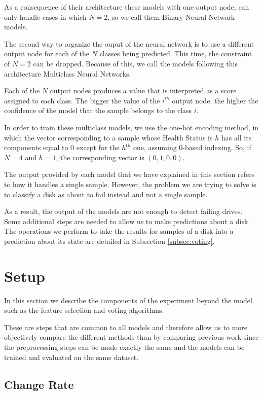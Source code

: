 As a consequence of their architecture these models with one output node, can only handle cases in which $N = 2$, so we call them Binary Neural Network models.

The second way to organize the ouput of the neural network is to use a different output node for each of the $N$ classes being predicted.
This time, the constraint of $N=2$ can be dropped.
Because of this, we call the models following this architecture Multiclass Neural Networks.

Each of the $N$ output nodes produces a value that is interpreted as a score assigned to each class.
The bigger the value of the $i^{th}$ output node, the higher the confidence of the model that the sample belongs to the class $i$.

In order to train these multiclass models, we use the one-hot encoding method, in which the vector corresponding to a sample whose Health Status is $h$ has all its components equal to 0 except for the $h^{th}$ one, assuming 0-based indexing.
So, if $N = 4$ and $h = 1$, the corresponding vector is $(0,1,0,0)$.

The output provided by each model that we have explained in this section refers to how it handles a single sample.
However, the problem we are trying to solve is to classify a disk as about to fail instead and not a single sample.

As a result, the output of the models are not enough to detect failing drives.
Some additional steps are needed to allow us to make predictions about a disk.
The operations we perform to take the results for samples of a disk into a prediction about its state are detailed in Subsection \ref{subsec:voting}.

\section{Setup}\label{sec:setup}

In this section we describe the components of the experiment beyond the model such as the feature selection and voting algorithms.

These are steps that are common to all models and therefore allow us to more objectively compare the different methods than by comparing previous work since the preprocessing steps can be made exactly the same and the models can be trained and evaluated on the same dataset.

\subsection{Change Rate}\label{subsec:change_rate}

